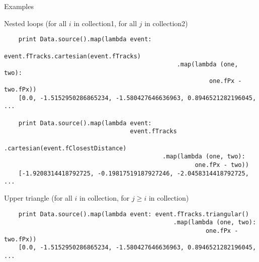 \documentclass{beamer}
\begin{document}
\begin{frame}[fragile]{Examples}
\begin{block}{Nested loops (for all $i$ in collection1, for all $j$ in collection2)}
\vspace{-0.5\baselineskip}
{\scriptsize \begin{verbatim}
    print Data.source().map(lambda event:
                                   event.fTracks.cartesian(event.fTracks)
                                                .map(lambda (one, two):
                                                         one.fPx - two.fPx))
    [0.0, -1.5152950286865234, -1.580427646636963, 0.8946521282196045, ...

    print Data.source().map(lambda event:
                                   event.fTracks
                                            .cartesian(event.fClosestDistance)
                                            .map(lambda (one, two):
                                                     one.fPx - two))
    [-1.9208314418792725, -0.19817519187927246, -2.0458314418792725, ...
\end{verbatim}}
\end{block}

\begin{block}{Upper triangle (for all $i$ in collection, for $j \ge i$ in collection)}
\vspace{-0.5\baselineskip}
{\scriptsize \begin{verbatim}
    print Data.source().map(lambda event: event.fTracks.triangular()
                                               .map(lambda (one, two):
                                                        one.fPx - two.fPx))
    [0.0, -1.5152950286865234, -1.580427646636963, 0.8946521282196045, ...
\end{verbatim}}
\vspace{-0.5\baselineskip}
\end{block}
\end{frame}
\end{document}
